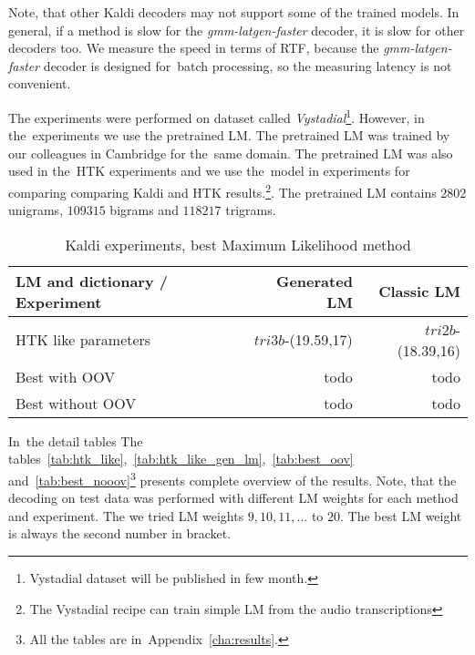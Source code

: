 {Note, that other Kaldi decoders may not support some of the trained models.
In general, if a method is slow for the {\it gmm-latgen-faster}\/ decoder, it is slow for other decoders too.
We measure the speed in terms of \ac{RTF}, because the {\it gmm-latgen-faster}\/ decoder is designed for~batch 
processing, so the measuring latency is not convenient.


The experiments were performed on dataset called {\it Vystadial}\footnote{Vystadial dataset will be published in few month.}.
However, in the~experiments we use the pretrained \ac{LM}.
The pretrained \acl{LM} was trained by our colleagues in Cambridge for the~same domain.
The pretrained \ac{LM} was also used in the~\ac{HTK} experiments and we use the~model in experiments 
for comparing comparing Kaldi and \ac{HTK} results.\footnote{The Vystadial recipe can train simple \ac{LM} from the audio transcriptions}.
The pretrained \ac{LM} contains $2802$ unigrams, $109315$ bigrams and
$118217$ trigrams. 


\begin{table}[!htp]\label{tab:exp_best}
\begin{tabular}{lrr}
\hline
\parbox[t]{6.0cm}{\ac{LM} and dictionary / Experiment} & Generated \acs{LM}  & Classic \ac{LM} \\
\hline
\ac{HTK} like parameters    &  $tri3b$-(19.59,17) & $tri2b$-(18.39,16) \\
Best with OOV               & todo & todo \\
Best without OOV            & todo & todo \\
\hline
\end{tabular}
\caption{Kaldi experiments, best Maximum Likelihood method}
\end{table}


In~the detail tables 
The tables~\ref{tab:htk_like},~\ref{tab:htk_like_gen_lm},~\ref{tab:best_oov} 
and~\ref{tab:best_nooov}\footnote{All the tables are in~Appendix~\ref{cha:results}.} presents complete overview of the results. 
Note, that the decoding on test data was performed with different \ac{LM} weights for each method and experiment. 
The we tried \ac{LM} weights $9, 10, 11, ...$ to $20$. 
The best \ac{LM} weight is always the second number in bracket.

}
